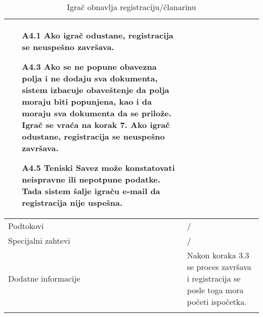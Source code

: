 \documentclass{article}
\begin{document}
\begin{longtable}{| p{} | p{} |}
\begin{itemize}
                    \item[A4.1] Ako igrač odustane, registracija se neuspešno završava.
                    \item[A4.3] Ako se ne popune obavezna polja i ne dodaju sva dokumenta, sistem izbacuje obaveštenje da polja moraju biti popunjena, kao i da moraju sva dokumenta da se prilože. Igrač se vraća na korak 7. Ako igrač odustane, registracija se neuspešno završava.
                    \item[A4.5] Teniski Savez može konstatovati neispravne ili nepotpune podatke. Tada sistem šalje igraču e-mail da registracija nije uspešna.
                \end{itemize}\\
            \hline
                Podtokovi & /\\
            \hline
                Specijalni zahtevi & /\\
            \hline
                Dodatne informacije & Nakon koraka 3.3 se proces završava i registracija se posle toga mora početi ispočetka. \\
            \hline
            \caption{Igrač obnavlja registraciju/članarinu}
        \end{longtable}
        
\end{document}
